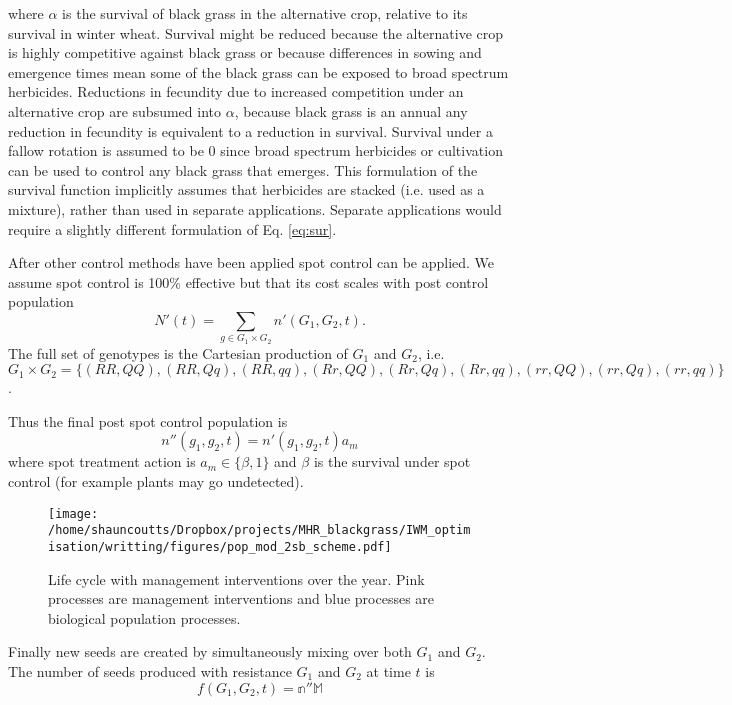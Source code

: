 \documentclass[12pt, a4paper]{article}
\begin{document}
where $\alpha$ is the survival of black grass in the alternative crop, relative to its survival in winter wheat. Survival might be reduced because the alternative crop is highly competitive against black grass or because differences in sowing and emergence times mean some of the black grass can be exposed to broad spectrum herbicides. Reductions in fecundity due to increased competition under an alternative crop are subsumed into $\alpha$, because black grass is an annual any reduction in fecundity is equivalent to a reduction in survival. Survival under a fallow rotation is assumed to be 0 since broad spectrum herbicides or cultivation can be used to control any black grass that emerges. This formulation of the survival function implicitly assumes that herbicides are stacked (i.e. used as a mixture), rather than used in separate applications. Separate applications would require a slightly different formulation of Eq. \ref{eq:sur}.

After other control methods have been applied spot control can be applied. We assume spot control is 100\% effective but that its cost scales with post control population
\begin{equation}\label{eq:tot_pop1}
	N'(t) = \sum_{g \in G_1 \times G_2} n'(G_1, G_2, t). 
\end{equation}
The full set of genotypes is the Cartesian production of $G_1$ and $G_2$, i.e. $G_1 \times G_2 = \{(RR, QQ), (RR, Qq), (RR, qq), (Rr, QQ), (Rr, Qq), (Rr, qq), (rr, QQ), (rr, Qq), (rr, qq) \}$.
 
Thus the final post spot control population is 
\begin{equation}\label{eq:spot_cont}
	n''(g_1, g_2, t) = n'(g_1, g_2, t)a_m
\end{equation}   
where spot treatment action is $a_m \in \{\beta, 1\}$ and $\beta$ is the survival under spot control (for example plants may go undetected).
 
\begin{figure}[H]
\texttt{[image: /home/shauncoutts/Dropbox/projects/MHR\_blackgrass/IWM\_optimisation/writting/figures/pop\_mod\_2sb\_scheme.pdf]}
\caption{Life cycle with management interventions over the year. Pink processes are management interventions and blue processes are biological population processes.}
\label{fig:life_cyc}
\end{figure} 

Finally new seeds are created by simultaneously mixing over both $G_1$ and $G_2$. The number of seeds produced with resistance $G_1$ and $G_2$ at time $t$ is 
\begin{equation}
\label{eq:fec}
	f(G_1, G_2, t) = \mathbb{n}''\mathbb{M}
\end{equation} 
\end{document}
